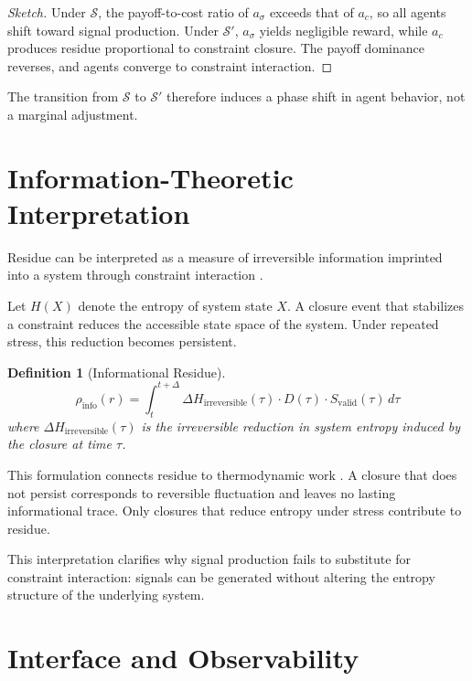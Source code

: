 \documentclass[12pt]{article}
\newtheorem{definition}{Definition}
\begin{document}
\begin{proof}[Sketch]
Under $\mathcal{S}$, the payoff-to-cost ratio of $a_\sigma$ exceeds that
of $a_c$, so all agents shift toward signal production. Under
$\mathcal{S}'$, $a_\sigma$ yields negligible reward, while $a_c$
produces residue proportional to constraint closure. The payoff
dominance reverses, and agents converge to constraint interaction.
\end{proof}

The transition from $\mathcal{S}$ to $\mathcal{S}'$ therefore induces a
phase shift in agent behavior, not a marginal adjustment.

\section{Information-Theoretic Interpretation}

Residue can be interpreted as a measure of irreversible information
imprinted into a system through constraint interaction
\cite{landauer1961,bennett1982,lloyd2000}.

Let $H(X)$ denote the entropy of system state $X$. A closure event that
stabilizes a constraint reduces the accessible state space of the
system. Under repeated stress, this reduction becomes persistent.

\begin{definition}[Informational Residue]
\[
  \rho_{\mathrm{info}}(r)
  =
  \int_{t}^{t+\Delta}
    \Delta H_{\mathrm{irreversible}}(\tau)
    \cdot D(\tau)
    \cdot S_{\mathrm{valid}}(\tau)
  \, d\tau
\]
where $\Delta H_{\mathrm{irreversible}}(\tau)$ is the irreversible
reduction in system entropy induced by the closure at time $\tau$.
\end{definition}

This formulation connects residue to thermodynamic work
\cite{georgescu1971,bennett1982}. A closure that
does not persist corresponds to reversible fluctuation and leaves no
lasting informational trace. Only closures that reduce entropy under
stress contribute to residue.

This interpretation clarifies why signal production fails to substitute
for constraint interaction: signals can be generated without altering
the entropy structure of the underlying system.

\section{Interface and Observability}
\end{document}
